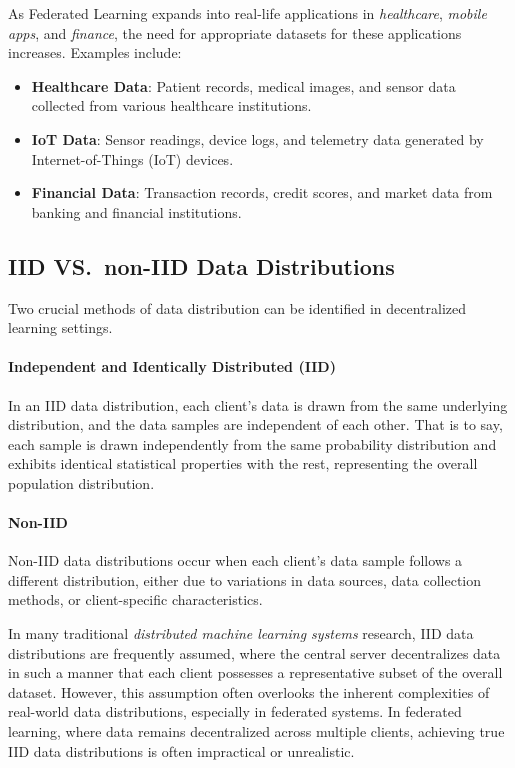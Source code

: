 As Federated Learning expands into real-life applications in \emph{healthcare}, \emph{mobile apps}, and \emph{finance}, the
need for appropriate datasets for these applications increases. Examples include:

\begin{itemize}
    \item \textbf{Healthcare Data}: Patient records, medical images, and sensor data collected from various healthcare institutions.
    \item \textbf{IoT Data}: Sensor readings, device logs, and telemetry data generated by Internet-of-Things (IoT) devices.
    \item \textbf{Financial Data}: Transaction records, credit scores, and market data from banking and financial institutions.
\end{itemize}

\subsection{IID VS.\ non-IID Data Distributions}
Two crucial methods of data distribution can be identified in decentralized learning settings.
\paragraph{Independent and Identically Distributed (IID)} In an IID data distribution, each client's data is drawn from the same underlying
distribution, and the data samples are independent of each other. That is to say, each sample is drawn independently from the same
probability distribution and exhibits identical statistical properties with the rest, representing the overall population distribution.

\paragraph{Non-IID} Non-IID data distributions occur when each client's data sample follows a different distribution, either due to variations in data
sources, data collection methods, or client-specific characteristics.

In many traditional \emph{distributed machine learning systems} research, IID data distributions
are frequently assumed, where the central server decentralizes data in such a manner that each client possesses a representative subset
of the overall dataset. However, this assumption often overlooks the inherent complexities of real-world data distributions, especially
in federated systems. In federated learning, where data remains decentralized across multiple clients, achieving true IID data distributions
is often impractical or unrealistic.

